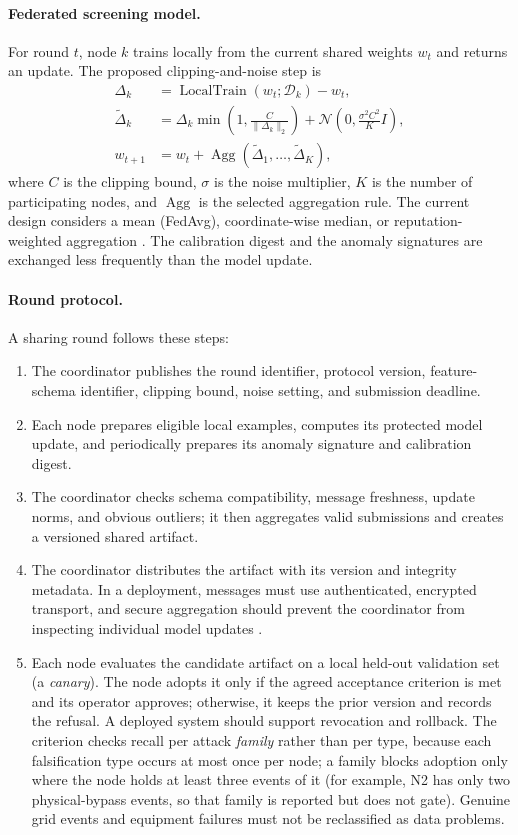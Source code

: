\paragraph{Federated screening model.} For round $t$, node $k$ trains locally from the current shared weights $w_t$ and returns an update. The proposed clipping-and-noise step is
\begin{align}
 \Delta_k &= \operatorname{LocalTrain}(w_t;\mathcal{D}_k)-w_t, \\
 \widetilde{\Delta}_k &= \Delta_k\min\!\left(1,\frac{C}{\lVert\Delta_k\rVert_2}\right)
 + \mathcal{N}\!\left(0,\frac{\sigma^2 C^2}{K}I\right), \\
 w_{t+1} &= w_t+\operatorname{Agg}(\widetilde{\Delta}_1,\ldots,\widetilde{\Delta}_K),
 \label{eq:goal4-fed-update}
\end{align}
where $C$ is the clipping bound, $\sigma$ is the noise multiplier, $K$ is the number of participating nodes, and $\operatorname{Agg}$ is the selected aggregation rule. The current design considers a mean (FedAvg), coordinate-wise median, or reputation-weighted aggregation \cite{mcmahan2017,yin2018}. The calibration digest and the anomaly signatures are exchanged less frequently than the model update.

\paragraph{Round protocol.} A sharing round follows these steps:
\begin{enumerate}
  \item The coordinator publishes the round identifier, protocol version, feature-schema identifier, clipping bound, noise setting, and submission deadline.
  \item Each node prepares eligible local examples, computes its protected model update, and periodically prepares its anomaly signature and calibration digest.
  \item The coordinator checks schema compatibility, message freshness, update norms, and obvious outliers; it then aggregates valid submissions and creates a versioned shared artifact.
  \item The coordinator distributes the artifact with its version and integrity metadata. In a deployment, messages must use authenticated, encrypted transport, and secure aggregation should prevent the coordinator from inspecting individual model updates \cite{bonawitz2017}.
  \item Each node evaluates the candidate artifact on a local held-out validation set (a \emph{canary}). The node adopts it only if the agreed acceptance criterion is met and its operator approves; otherwise, it keeps the prior version and records the refusal. A deployed system should support revocation and rollback. The criterion checks recall per attack \emph{family} rather than per type, because each falsification type occurs at most once per node; a family blocks adoption only where the node holds at least three events of it (for example, N2 has only two physical-bypass events, so that family is reported but does not gate). Genuine grid events and equipment failures must not be reclassified as data problems.
\end{enumerate}

